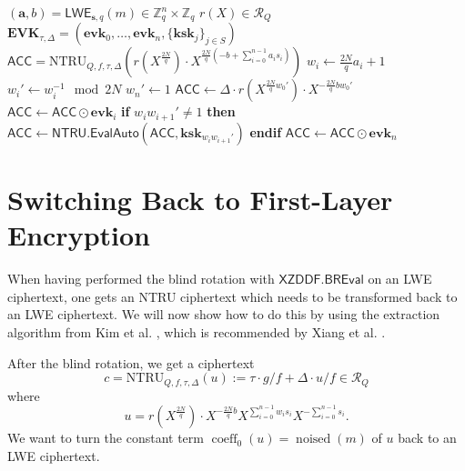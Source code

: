 \renewcommand{\Comment}[2][.32\linewidth]{\leavevmode\hfill\makebox[#1][l]{//~#2}}  %
\begin{algorithm}[ht]
\caption{\;\;$\mathsf{XZDDF.BREval}$}\label{alg:breval}
\begin{algorithmic}
\Require
  \State $(\mathbf{a}, b) = \mathsf{LWE}_{\mathbf{s},q}(m) \in \mathbb{Z}_q^{n} \times \mathbb{Z}_q$ 
  \State $r(X) \in \mathcal{R}_Q$ \Comment{rotation polynomial}
  \State $\mathbf{EVK}_{\tau, \Delta} = (\mathbf{evk}_0, \ldots, \mathbf{evk}_n, \{ \mathbf{ksk}_j  \}_{j \in S})$  %
\Ensure $\mathsf{ACC} = \mathrm{NTRU}_{Q, f, \tau, \Delta}\left(r(X^{\frac{2N}{q}}) \cdot X^{\frac{2N}{q} (-b  + \sum_{i=0}^{n-1}a_is_i)}\right)$
    \State $w_i \gets \frac{2N}{q}a_i+1$
    \State $w_i' \gets w_i^{-1} \mod 2N$
  \EndFor
  \State $w_n' \gets 1$
  \State $\mathsf{ACC} \gets \Delta \cdot r(X^{\frac{2N}{q}w_0'}) \cdot X^{-\frac{2N}{q}bw_0'}$
    \State $\mathsf{ACC} \gets \mathsf{ACC} \odot \mathbf{evk}_i$
    \State \textbf{if} $w_iw_{i+1}' \neq 1$ \textbf{then}
      \State \;\;\; $\mathsf{ACC} \gets \mathsf{NTRU.EvalAuto}(\mathsf{ACC}, \mathbf{ksk}_{w_iw_{i+1}'})$ 
    \State \textbf{endif}
  \EndFor
    \State $\mathsf{ACC} \gets \mathsf{ACC} \odot \mathbf{evk}_n$  
\end{algorithmic}
\end{algorithm}


\section{Switching Back to First-Layer Encryption}

When having performed the blind rotation with $\mathsf{XZDDF.BREval}$ on an LWE ciphertext, one gets an NTRU ciphertext which needs to be transformed back to an LWE ciphertext. We will now show how to do this by using the extraction algorithm from Kim et al. \cite{cite:extract_blind_rotation}, which is recommended by Xiang et al. \cite{cite:fast_bootstrap_crypto23}.

After the blind rotation, we get a ciphertext 
$$c = \mathrm{NTRU}_{Q, f, \tau, \Delta}(u) := \tau \cdot g/f + \Delta \cdot u/f \in \mathcal{R}_Q$$
where
$$u = r(X^{\frac{2N}{q}}) \cdot X^{-\frac{2N}{q}b} X^{\sum_{i=0}^{n-1}w_is_i} X^{-\sum_{i=0}^{n-1}s_i}.$$
We want to turn the constant term $\operatorname{coeff}_0(u) = \operatorname{noised}(m)$ of $u$ back to an LWE ciphertext.

